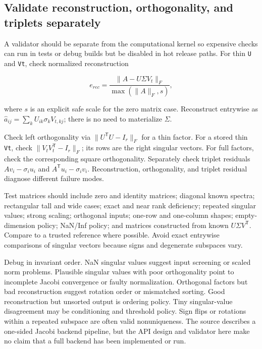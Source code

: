 \subsection{Validate reconstruction, orthogonality, and triplets separately}\label{validate-reconstruction-orthogonality-and-triplets-separately}

A validator should be separate from the computational kernel so expensive checks can run in tests or debug builds but be disabled in hot release paths. For thin \texttt{U} and \texttt{Vt}, check normalized reconstruction

\[
e_{rec}=\frac{\|A-U\Sigma V_t\|_F}{\max(\|A\|_F,s)},
\]

where \(s\) is an explicit safe scale for the zero matrix case. Reconstruct entrywise as \(\hat a_{ij}=\sum_k U_{ik}\sigma_kV_{t,kj}\); there is no need to materialize \(\Sigma\).

Check left orthogonality via \(\|U^\mathsf TU-I_r\|_F\) for a thin factor. For a stored thin \texttt{Vt}, check \(\|V_tV_t^\mathsf T-I_r\|_F\); its rows are the right singular vectors. For full factors, check the corresponding square orthogonality. Separately check triplet residuals \(Av_i-\sigma_i u_i\) and \(A^\mathsf Tu_i-\sigma_i v_i\). Reconstruction, orthogonality, and triplet residual diagnose different failure modes.

Test matrices should include zero and identity matrices; diagonal known spectra; rectangular tall and wide cases; exact and near rank deficiency; repeated singular values; strong scaling; orthogonal inputs; one-row and one-column shapes; empty-dimension policy; NaN/Inf policy; and matrices constructed from known \(U\Sigma V^\mathsf T\). Compare to a trusted reference where possible. Avoid exact entrywise comparisons of singular vectors because signs and degenerate subspaces vary.

Debug in invariant order. NaN singular values suggest input screening or scaled norm problems. Plausible singular values with poor orthogonality point to incomplete Jacobi convergence or faulty normalization. Orthogonal factors but bad reconstruction suggest rotation order or mismatched sorting. Good reconstruction but unsorted output is ordering policy. Tiny singular-value disagreement may be conditioning and threshold policy. Sign flips or rotations within a repeated subspace are often valid nonuniqueness. The source describes a one-sided Jacobi backend pipeline, but the API design and validator here make no claim that a full backend has been implemented or run.

